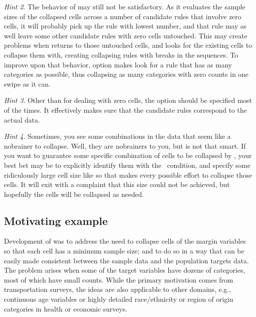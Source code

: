 \textit{Hint 2}. The behavior of  may still not be
satisfactory. As it evaluates the sample sizes of the collapsed cells across a number
of candidate rules that involve zero cells, it will probably pick up the rule with lowest
number, and that rule may as well leave some other candidate rules with zero cells untouched.
This may create problems when  returns to those untouched cells,
and looks for the existing cells to collapse them with, creating collapsing rules with breaks
in the sequences. To improve upon that behavior, option  makes
 look for a rule that has as many categories as possible, thus collapsing
as many categories with zero counts in one swipe as it can.

\textit{Hint 3}. Other than for dealing with zero cells, the option  should be specified
most of the times. It effectively makes sure that the candidate rules correspond to the actual data.

\textit{Hint 4}. Sometimes, you see some combinations in the data that seem like a nobrainer
to collapse. Well, they are nobrainers to you, but  is not that smart.
If you want to guarantee some specific combination of cells to be collapsed by ,
your best bet may be to explicitly identify them with the \ifexp\ condition, and specify some
ridiculously large cell size like  so that  makes every possible
effort to collapse those cells. It will exit with a complaint that this size could not be achieved,
but hopefully the cells will be collapsed as needed.

\subsection{Motivating example}
\label{subsec:example}

Development of  was to address the need
to collapse cells of the margin variables so that each cell has a minimum sample size;
and to do so in a way that can be easily made consistent between the sample data
and the population targets data. The problem arises when some of the target
variables have dozens of categories, most of which have small counts.
While the primary motivation comes from transportation surveys,
the ideas are also applicable to other domains, e.g.,
continuous age variables or highly detailed race/ethnicity or region of origin
categories in health or economic surveys.

